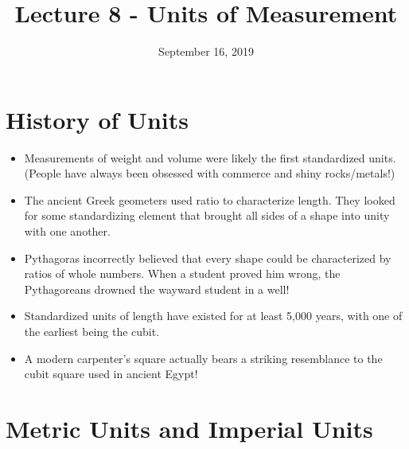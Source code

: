 \documentclass{article}
\title{Lecture 8 - Units of Measurement}
\author{}
\date{September 16, 2019}
\begin{document}
\maketitle

\section*{History of Units}
\begin{itemize}
\item Measurements of weight and volume were likely the first standardized units.  (People have always been obsessed with commerce and shiny rocks/metals!)
\item The ancient Greek geometers used ratio to characterize length.  They looked for some standardizing element that brought all sides of a shape into unity with one another.
\item Pythagoras incorrectly believed that every shape could be characterized by ratios of whole numbers.  When a student proved him wrong, the Pythagoreans drowned the wayward student in a well!
\item Standardized units of length have existed for at least 5,000 years, with one of the earliest being the cubit.
\item A modern carpenter's square actually bears a striking resemblance to the cubit square used in ancient Egypt!
\end{itemize}

\section*{Metric Units and Imperial Units}
\end{document}
